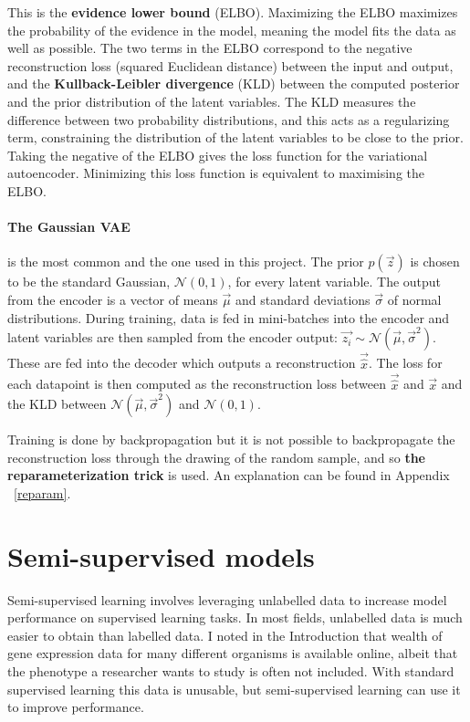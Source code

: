 This is the \textbf{evidence lower bound} (ELBO). Maximizing the ELBO maximizes the probability of the 
evidence in the model, meaning the model fits the data as well as possible. The two terms in the ELBO correspond to the negative 
reconstruction loss (squared Euclidean distance) between the input and output, and the \textbf{Kullback-Leibler divergence} (KLD) between 
the computed posterior and the prior distribution of the latent variables. 
The KLD measures the difference between two probability distributions, and this acts as a regularizing term, constraining the distribution 
of the latent variables to be close to the prior. Taking the 
negative of the ELBO gives the loss function for the variational autoencoder. Minimizing this loss function is equivalent to maximising the ELBO.

\paragraph{The Gaussian VAE}is the most common and the one used in this project. The prior $p(\vec{z})$ is chosen to be the standard Gaussian, 
$\mathcal{N}(0, 1)$,
for every latent variable. The output from the encoder is a vector of means $\vec{\mu}$ and standard deviations $\vec{\sigma}$ of normal distributions. 
During training, data is fed in mini-batches into the encoder and latent variables are then sampled from the encoder output: 
$\vec{z_{i}} \sim \mathcal{N}(\vec{\mu}, \vec{\sigma}^{2})$. These are fed into the decoder which outputs a reconstruction $\vec{\hat{x}}$. 
The loss for each datapoint is then computed as the reconstruction loss between $\vec{\hat{x}}$ and $\vec{x}$ and the KLD between
$\mathcal{N}(\vec{\mu}, \vec{\sigma}^{2})$ and $\mathcal{N}(0, 1)$.

Training is done by backpropagation but
it is not possible to backpropagate the reconstruction loss through the drawing of the random sample, and so 
\textbf{the reparameterization trick} is used. 
An explanation can be found in Appendix ~\ref{reparam}.

\section{Semi-supervised models} \label{ss_models}

Semi-supervised learning involves leveraging unlabelled data to increase model performance on supervised learning tasks. 
In most fields, unlabelled data is much easier to obtain than labelled data. I noted in the Introduction that wealth of gene 
expression data for many different organisms is available online, albeit that the phenotype a researcher wants 
to study is often not included. With standard supervised learning this data is unusable, but semi-supervised learning
can use it to improve performance. 

